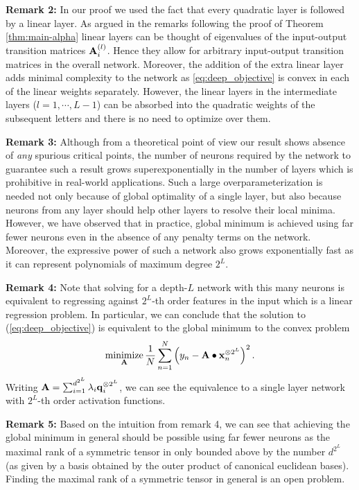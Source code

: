 \documentclass[11pt]{article}
\theoremstyle{plain}
\DeclareMathOperator*{\minimize}{minimize}
\theoremstyle{plain}
\numberwithin{equation}{section}
\numberwithin{lemma}{section}
\numberwithin{theorem}{section}
\numberwithin{corollary}{section}
\numberwithin{observation}{section}
\numberwithin{definition}{section}
\numberwithin{example}{section}
\begin{document}
\textbf{Remark 2:} In our proof we used the fact that every quadratic layer is followed by a linear layer. As argued in the remarks following the proof of Theorem \ref{thm:main-alpha} linear layers can be thought of eigenvalues of the input-output transition matrices $\Mx{A}_i^{(l)}$. Hence they allow for arbitrary input-output transition matrices in the overall network. Moreover, the addition of the extra linear layer adds minimal complexity to the network as \ref{eq:deep_objective} is convex in each of the linear weights separately. However, the linear layers in the intermediate layers ($l=1, \cdots, L-1$) can be absorbed into the quadratic weights of the subsequent letters and there is no need to optimize over them.

\textbf{Remark 3:} Although from a theoretical point of view our result shows absence of \textit{any} spurious critical points, the number of neurons required by the network to guarantee such a result grows superexponentially in the number of layers which is prohibitive in real-world applications. Such a large overparameterization is needed not only because of global optimality of a single layer, but also because neurons from any layer should help other layers to resolve their local minima. However, we have observed that in practice, global minimum is achieved using far fewer neurons even in the absence of any penalty terms on the network. Moreover, the expressive power of such a network also grows exponentially fast as it can represent polynomials of maximum degree $2^L$.

\textbf{Remark 4:} Note that solving for a depth-$L$ network with this many neurons is equivalent to regressing against $2^{L}$-th order features in the input which is a linear regression problem. In particular, we can conclude that the solution to (\ref{eq:deep_objective}) is equivalent to the global minimum to the convex problem
\[
 \minimize_{\Mx{A}} \frac{1}{N}\sum_{n=1}^{N} \left(y_n - \Mx{A}\bullet \V{x}^{{\otimes 2^{L}}}_n \right)^2.
\]
Writing $\Mx{A} = \sum_{i = 1}^{d^{2^{L}}} \lambda_i \V{q}_i^{\otimes 2^{L}}$, we can see the equivalence to a single layer network with $2^{L}$-th order activation functions.

\textbf{Remark 5:} Based on the intuition from remark 4, we can see that achieving the global minimum in general should be possible using far fewer neurons as the maximal rank of a symmetric tensor in only bounded above by the number $d^{2^L}$ (as given by a basis obtained by the outer product of canonical euclidean bases). Finding the maximal rank of a symmetric tensor in general is an open problem.  
\end{document}
